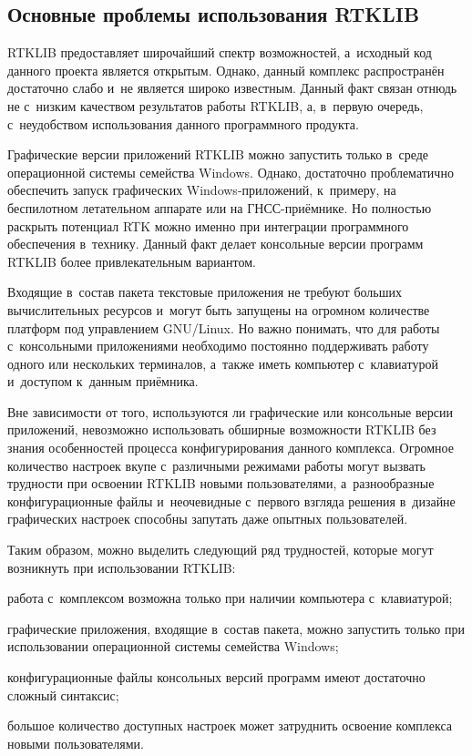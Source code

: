 \subsection{Основные проблемы использования RTKLIB}
\label{subsec:rtklib-problems}

RTKLIB предоставляет широчайший спектр возможностей, а~исходный код данного проекта является открытым. Однако, данный комплекс распространён достаточно слабо и~не является широко известным. Данный факт связан отнюдь не с~низким качеством результатов работы RTKLIB, а, в~первую очередь, с~неудобством использования данного программного продукта.

Графические версии приложений RTKLIB можно запустить только в~среде операционной системы семейства Windows. Однако, достаточно проблематично обеспечить запуск графических Windows-приложений, к~примеру, на беспилотном летательном аппарате или на ГНСС-приёмнике. Но полностью раскрыть потенциал RTK можно именно при интеграции программного обеспечения в~технику. Данный факт делает консольные версии программ RTKLIB более привлекательным вариантом.

Входящие в~состав пакета текстовые приложения не требуют больших вычислительных ресурсов и~могут быть запущены на огромном количестве платформ под управлением GNU/Linux. Но важно понимать, что для работы с~консольными приложениями необходимо постоянно поддерживать работу одного или нескольких терминалов, а~также иметь компьютер с~клавиатурой и~доступом к~данным приёмника.

Вне зависимости от того, используются ли графические или консольные версии приложений, невозможно использовать обширные возможности RTKLIB без знания особенностей процесса конфигурирования данного комплекса. Огромное количество настроек вкупе с~различными режимами работы могут вызвать трудности при освоении RTKLIB новыми пользователями, а~разнообразные конфигурационные файлы и~неочевидные с~первого взгляда решения в~дизайне графических настроек способны запутать даже опытных пользователей.

Таким образом, можно выделить следующий ряд трудностей, которые могут возникнуть при использовании RTKLIB:

\begin{dashitemize}
  \item работа с~комплексом возможна только при наличии компьютера с~клавиатурой;
  \item графические приложения, входящие в~состав пакета, можно запустить только при использовании операционной системы семейства Windows;
  \item конфигурационные файлы консольных версий программ имеют достаточно сложный синтаксис;
  \item большое количество доступных настроек может затруднить освоение комплекса новыми пользователями.
\end{dashitemize}

